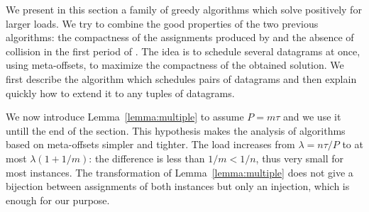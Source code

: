 We present in this section a family of greedy algorithms which solve \pma positively for larger loads. We try to combine the good properties of the two previous algorithms: the compactness of the assignments produced by \firstfit and the absence of collision in the first period of \metaoffset. The idea is to schedule several datagrams at once, using meta-offsets, to maximize the compactness of the obtained solution. We first describe the algorithm which schedules pairs of datagrams and then explain quickly how to extend it to any tuples of datagrams.


We now introduce Lemma~\ref{lemma:multiple} to assume $P = m\tau$ and we use it untill the end of the section. This hypothesis makes the analysis of algorithms based on meta-offsets simpler and tighter. The load increases from $\lambda = n \tau / P$ to at most $\lambda (1 + 1/m)$: the difference is less than $1/m < 1/n$, thus very small for most instances. The transformation of Lemma~\ref{lemma:multiple} does not give a bijection between assignments of both instances but only an injection, which is enough for our purpose. 

